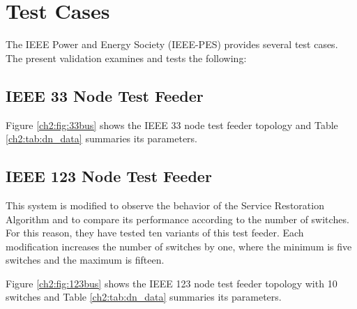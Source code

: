 \section{Test Cases}
\label{ch2:sec:test_cases}
The IEEE Power and Energy Society (IEEE-PES) provides several test cases. The present validation examines and tests the following: 

\subsection{IEEE 33 Node Test Feeder}
Figure \ref{ch2:fig:33bus} shows the IEEE 33 node test feeder topology and Table \ref{ch2:tab:dn_data} summaries its parameters. 




\subsection{IEEE 123 Node Test Feeder}

This system is modified to observe the behavior of the Service Restoration Algorithm and to compare 
its performance according to the number of switches. For this reason, they have tested ten variants 
of this test feeder. Each modification increases the number of switches by one, where the minimum is 
five switches and the maximum is fifteen.

Figure \ref{ch2:fig:123bus} shows the IEEE 123 node test feeder topology with 10 switches and 
Table \ref{ch2:tab:dn_data} summaries its parameters. 



%

